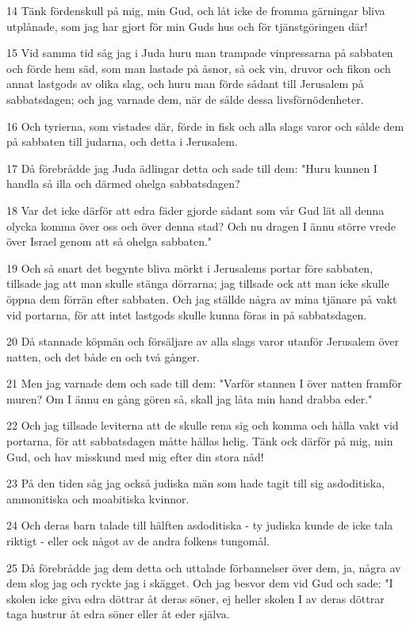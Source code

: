\par 14 Tänk fördenskull på mig, min Gud, och låt icke de fromma gärningar bliva utplånade, som jag har gjort för min Guds hus och för tjänstgöringen där!
\par 15 Vid samma tid såg jag i Juda huru man trampade vinpressarna på sabbaten och förde hem säd, som man lastade på åsnor, så ock vin, druvor och fikon och annat lastgods av olika slag, och huru man förde sådant till Jerusalem på sabbatsdagen; och jag varnade dem, när de sålde dessa livsförnödenheter.
\par 16 Och tyrierna, som vistades där, förde in fisk och alla slags varor och sålde dem på sabbaten till judarna, och detta i Jerusalem.
\par 17 Då förebrådde jag Juda ädlingar detta och sade till dem: "Huru kunnen I handla så illa och därmed ohelga sabbatsdagen?
\par 18 Var det icke därför att edra fäder gjorde sådant som vår Gud lät all denna olycka komma över oss och över denna stad? Och nu dragen I ännu större vrede över Israel genom att så ohelga sabbaten."
\par 19 Och så snart det begynte bliva mörkt i Jerusalems portar före sabbaten, tillsade jag att man skulle stänga dörrarna; jag tillsade ock att man icke skulle öppna dem förrän efter sabbaten. Och jag ställde några av mina tjänare på vakt vid portarna, för att intet lastgods skulle kunna föras in på sabbatsdagen.
\par 20 Då stannade köpmän och försäljare av alla slags varor utanför Jerusalem över natten, och det både en och två gånger.
\par 21 Men jag varnade dem och sade till dem: "Varför stannen I över natten framför muren? Om I ännu en gång gören så, skall jag låta min hand drabba eder."
\par 22 Och jag tillsade leviterna att de skulle rena sig och komma och hålla vakt vid portarna, för att sabbatsdagen måtte hållas helig. Tänk ock därför på mig, min Gud, och hav misskund med mig efter din stora nåd!
\par 23 På den tiden såg jag också judiska män som hade tagit till sig asdoditiska, ammonitiska och moabitiska kvinnor.
\par 24 Och deras barn talade till hälften asdoditiska - ty judiska kunde de icke tala riktigt - eller ock något av de andra folkens tungomål.
\par 25 Då förebrådde jag dem detta och uttalade förbannelser över dem, ja, några av dem slog jag och ryckte jag i skägget. Och jag besvor dem vid Gud och sade: "I skolen icke giva edra döttrar åt deras söner, ej heller skolen I av deras döttrar taga hustrur åt edra söner eller åt eder själva.

